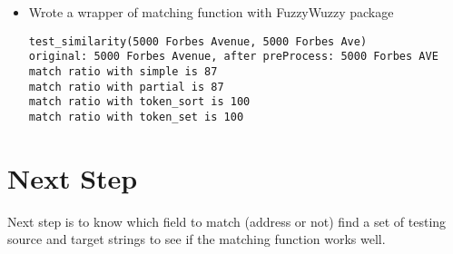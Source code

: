 \documentclass[12pt]{article}
\begin{document}
\begin{itemize}
\item Wrote a wrapper of matching function with FuzzyWuzzy package
\begin{verbatim}
test_similarity(5000 Forbes Avenue, 5000 Forbes Ave)
original: 5000 Forbes Avenue, after preProcess: 5000 Forbes AVE
match ratio with simple is 87
match ratio with partial is 87
match ratio with token_sort is 100
match ratio with token_set is 100
\end{verbatim}
\end{itemize}
\section{Next Step}
Next step is to know which field to match (address or not)
find a set of testing source and target strings to see if the matching
function works well.

\newpage


\end{document}
